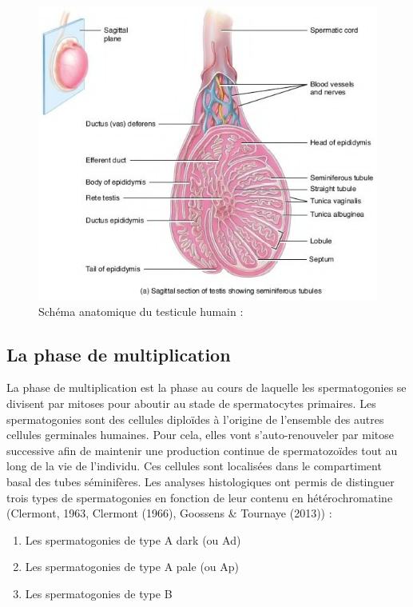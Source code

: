 \documentclass[12pt,twoside]{reedthesis}
\providecommand{\tightlist}{%
  \setlength{\itemsep}{0pt}\setlength{\parskip}{0pt}}
\theoremstyle{definition}
\theoremstyle{definition}
\theoremstyle{remark}
\begin{document}
  \begin{figure}
  
  {\centering \includegraphics[scale=0.65]{figure/coupe_testicule2} 
  
  }
  
  \caption{Schéma anatomique du testicule humain : }\label{fig:testicule}
  \end{figure}
  
  \subsection{La phase de
  multiplication}\label{la-phase-de-multiplication}
  
  La phase de multiplication est la phase au cours de laquelle les
  spermatogonies se divisent par mitoses pour aboutir au stade de
  spermatocytes primaires. Les spermatogonies sont des cellules diploïdes
  à l'origine de l'ensemble des autres cellules germinales humaines. Pour
  cela, elles vont s'auto-renouveler par mitose successive afin de
  maintenir une production continue de spermatozoïdes tout au long de la
  vie de l'individu. Ces cellules sont localisées dans le compartiment
  basal des tubes séminifères. Les analyses histologiques ont permis de
  distinguer trois types de spermatogonies en fonction de leur contenu en
  hétérochromatine (Clermont, 1963, Clermont (1966), Goossens \& Tournaye
  (2013)) :
  
  \begin{enumerate}
  \def\labelenumi{\arabic{enumi}.}
  \tightlist
  \item
    Les spermatogonies de type A dark (ou Ad)\\
  \item
    Les spermatogonies de type A pale (ou Ap)\\
  \item
    Les spermatogonies de type B
  \end{enumerate}
  
\end{document}
